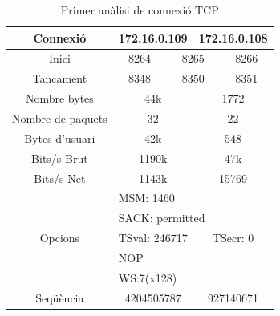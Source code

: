 \documentclass{article}
\begin{document}
\begin{table}[!h]
\centering
\begin{tabular}{c|cccccc}
Connexió &\multicolumn{3}{c}{172.16.0.109} &\multicolumn{3}{c}{172.16.0.108}\\
\hline
Inici &\multicolumn{2}{c}{8264} &\multicolumn{2}{c}{8265} &\multicolumn{2}{c}{8266}\\
\hline
Tancament &\multicolumn{2}{c}{8348} &\multicolumn{2}{c}{8350} &\multicolumn{2}{c}{8351}\\
\hline
Nombre bytes &\multicolumn{3}{c}{44k} &\multicolumn{3}{c}{1772}\\
\hline
Nombre de paquets &\multicolumn{3}{c}{32} &\multicolumn{3}{c}{22}\\
\hline
Bytes d'usuari &\multicolumn{3}{c}{42k} &\multicolumn{3}{c}{548}\\
\hline
Bits/s Brut &\multicolumn{3}{c}{1190k} &\multicolumn{3}{c}{47k}\\
\hline
Bits/s Net &\multicolumn{3}{c}{1143k} &\multicolumn{3}{c}{15769}\\
\hline
\multirow{5}{*}{Opcions} &\multicolumn{6}{l}{MSM: 1460} \\
&\multicolumn{6}{l}{SACK: permitted}\\
&\multicolumn{3}{c}{TSval: 246717}
&\multicolumn{3}{c}{TSecr: 0}\\
&\multicolumn{6}{l}{NOP}\\
&\multicolumn{6}{l}{WS:7(x128)}\\
\hline
Seqüència &\multicolumn{3}{c}{4204505787} &\multicolumn{3}{c}{927140671}\\

\end{tabular}
\caption{Primer anàlisi de connexió TCP}
\label{ana:fst}
\end{table}
\end{document}
